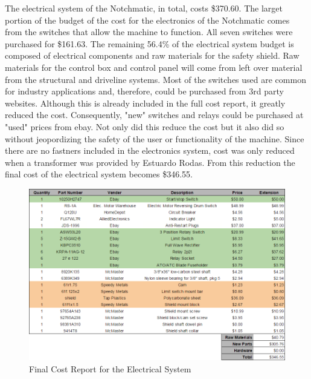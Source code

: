 The electrical system of the Notchmatic, in total, costs \$370.60. The larget portion of the budget of the cost for the electronics of the Notchmatic comes from the switches that allow the machine to function. All seven switches were purchased for \$161.63. The remaining 56.4\% of the electrical system budget is composed of electrical components and raw materials for the safety shield. Raw materials for the control box and control panel will come from left over material from the structural and driveline systems. Most of the switches used are common for industry applications and, therefore, could be purchased from 3rd party websites. Although this is already included in the full cost report, it greatly reduced the cost. Consequently, "new" switches and relays could be purchased at "used" prices from ebay. Not only did this reduce the cost but it also did so without jeopordizing the safety of the user or functionality of the machine.
Since there are no fastners included in the electronics system, cost was only reduced when a transformer was provided by Estuardo Rodas. From this reduction the final cost of the electrical system becomes \$346.55.

\begin{figure}[htp]
    \centering
    \includegraphics[width=1.0\textwidth]{./images/Chapter4-BillofMaterials/FCRE}
    \caption{Final Cost Report for the Electrical System}
    \label{fig:FCRE}
\end{figure}